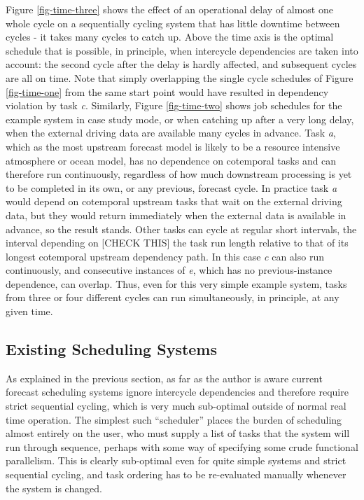 \documentclass[11pt,a4paper]{article}
\begin{document}
Figure \ref{fig-time-three} shows the effect of an operational delay of
almost one whole cycle on a sequentially cycling system that has little
downtime between cycles - it takes many cycles to catch up. Above the
time axis is the optimal schedule that is possible, in principle, when
intercycle dependencies are taken into account: the second cycle after
the delay is hardly affected, and subsequent cycles are all on time.
Note that simply overlapping the single cycle schedules of Figure
\ref{fig-time-one} from the same start point would have resulted in
dependency violation by task {\em c}. Similarly, Figure
\ref{fig-time-two} shows job schedules for the example system in case
study mode, or when catching up after a very long delay, when the
external driving data are available many cycles in advance.  Task {\em
a}, which as the most upstream forecast model is likely to be a resource
intensive atmosphere or ocean model, has no dependence on cotemporal
tasks and can therefore run continuously, regardless of how much
downstream processing is yet to be completed in its own, or any
previous, forecast cycle. In practice task {\em a} would depend on
cotemporal upstream tasks that wait on the external driving data, but
they would return immediately when the external data is available in
advance, so the result stands. Other tasks can cycle at regular short
intervals, the interval depending on [CHECK THIS] the task run length
relative to that of its longest cotemporal upstream dependency path. In
this case {\em c} can also run continuously, and consecutive instances
of {\em e}, which has no previous-instance dependence, can overlap.
Thus, even for this very simple example system, tasks from three or four
different cycles can run simultaneously, in principle, at any given
time. 


\subsection{Existing Scheduling Systems}

As explained in the previous section, as far as the author is aware
current forecast scheduling systems ignore intercycle dependencies and
therefore require strict sequential cycling, which is very much
sub-optimal outside of normal real time operation. The simplest such
``scheduler'' places the burden of scheduling almost entirely on the
user, who must supply a list of tasks that the system will run through
sequence, perhaps with some way of specifying some crude functional
parallelism. This is clearly sub-optimal even for quite simple systems
and strict sequential cycling, and task ordering has to be re-evaluated
manually whenever the system is changed. 
\end{document}
